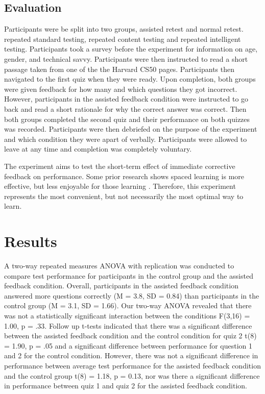 \documentclass[acmtog]{acmart}
\begin{document}
\subsection{Evaluation}
Participants were be split into two groups, assisted retest and normal retest. repeated standard testing, repeated content testing and repeated intelligent testing. Participants took a survey before the experiment for information on age, gender, and technical savvy. Participants were then instructed to read a short passage taken from one of the the Harvard CS50 pages. Participants then navigated to the first quiz when they were ready. Upon completion, both groups were given feedback for how many and which questions they got incorrect. However, participants in the assisted feedback condition were instructed to go back and read a short rationale for why the correct answer was correct. Then both groups completed the second quiz and their performance on both quizzes was recorded. Participants were then debriefed on the purpose of the experiment and which condition they were apart of verbally. Participants were allowed to leave at any time and completion was completely voluntary.

The experiment aims to test the short-term effect of immediate corrective feedback on performance. Some prior research shows spaced learning is more effective, but less enjoyable for those learning \cite{su2021levels}. Therefore, this experiment represents the most convenient, but not necessarily the most optimal way to learn.

\section{Results}
A two-way repeated measures ANOVA with replication was conducted to compare test performance for participants in the control group and the assisted feedback condition. Overall, participants in the assisted feedback condition answered more questions correctly (M = 3.8, SD = 0.84) than participants in the control group (M = 3.1, SD = 1.66). Our two-way ANOVA revealed that there was not a statistically significant interaction between the conditions F(3,16) = 1.00, p = .33. Follow up t-tests indicated that there was a significant difference between the assisted feedback condition and the control condition for quiz 2 t(8) = 1.90, p = .05 and a significant difference between performance for question 1 and 2 for the control condition. However, there was not a significant difference in performance between average test performance for the assisted feedback condition and the control group t(8) = 1.18, p = 0.13, nor was there a significant difference in performance between quiz 1 and quiz 2 for the assisted feedback condition.
\end{document}
